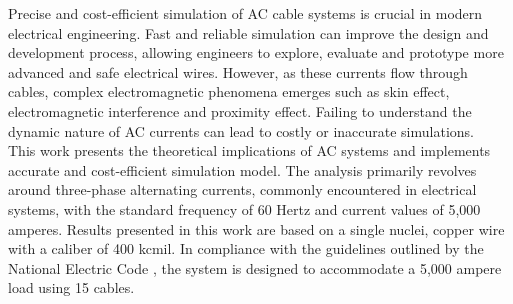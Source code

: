 \label{sec:INTRO}
Precise and cost-efficient simulation of AC cable systems is crucial in modern electrical engineering. 
Fast and reliable simulation can improve the design and development process, allowing engineers to explore, evaluate and prototype more advanced and safe electrical wires. 
However, as these currents flow through cables, complex electromagnetic phenomena emerges such as skin effect, electromagnetic interference and proximity effect. 
Failing to understand the dynamic nature of AC currents can lead to costly or inaccurate simulations. 
\\

This work presents the theoretical implications of AC systems and implements accurate and cost-efficient simulation model. 
The analysis primarily revolves around three-phase alternating currents, commonly encountered in electrical systems, with the standard frequency of 60 Hertz and current values of 5,000 amperes.
Results presented in this work are based on a single nuclei, copper wire with a caliber of 400 kcmil. In compliance with the guidelines outlined by the National Electric Code \cite{NEC2020}, the system is designed to accommodate a 5,000 ampere load using 15 cables.
\\

